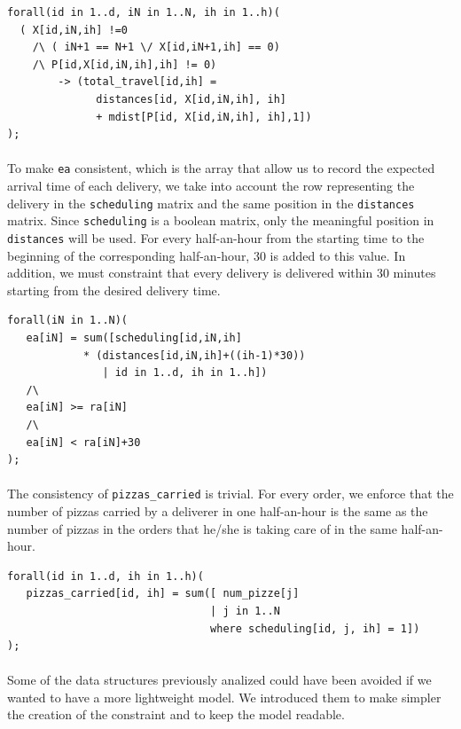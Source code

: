 \documentclass[10pt]{article}
\begin{document}
	\begin{verbatim}
forall(id in 1..d, iN in 1..N, ih in 1..h)(
  ( X[id,iN,ih] !=0 
    /\ ( iN+1 == N+1 \/ X[id,iN+1,ih] == 0) 
    /\ P[id,X[id,iN,ih],ih] != 0)
        -> (total_travel[id,ih] = 
              distances[id, X[id,iN,ih], ih] 
              + mdist[P[id, X[id,iN,ih], ih],1])       
);
	\end{verbatim}

	\paragraph*{}
	To make \texttt{ea} consistent, which is the array that allow us to record the expected arrival
	time of each delivery, we take into account the row representing the delivery in the 
	\texttt{scheduling} matrix and the same position in the \texttt{distances} matrix. Since 
	\texttt{scheduling} is a boolean matrix, only the meaningful position in 
	\texttt{distances} will be used. For every half-an-hour from the starting time to the 
	beginning of the corresponding half-an-hour, 30 is added to this value. 
	In addition, we must constraint that every delivery is delivered within 
	30 minutes starting from the desired delivery time.
	\begin{verbatim}
forall(iN in 1..N)(
   ea[iN] = sum([scheduling[id,iN,ih]
            * (distances[id,iN,ih]+((ih-1)*30)) 
               | id in 1..d, ih in 1..h])
   /\
   ea[iN] >= ra[iN] 
   /\ 
   ea[iN] < ra[iN]+30 
);
	\end{verbatim}


	\paragraph*{}
	The consistency of \texttt{pizzas\_carried} is trivial. For every order, we enforce that the 
	number of pizzas carried by a deliverer in one half-an-hour is the same as the number of 
	pizzas in the orders that he/she is taking care of in the same half-an-hour.
	\begin{verbatim}
forall(id in 1..d, ih in 1..h)(
   pizzas_carried[id, ih] = sum([ num_pizze[j]
                                | j in 1..N 
                                where scheduling[id, j, ih] = 1])
);
	\end{verbatim}

	\paragraph*{}
	Some of the data structures previously analized could have been avoided if we 
	wanted to have a more lightweight model. We introduced them to make simpler the
	creation of the constraint and to keep the model readable.
	
\end{document}
